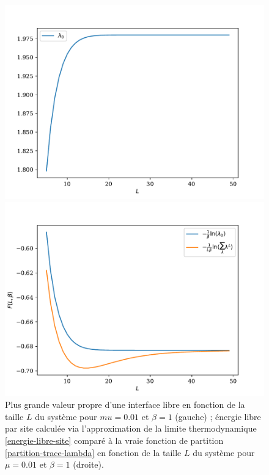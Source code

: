 \begin{figure}
	\begin{minipage}[t]{0.5\linewidth}
		\includegraphics[width=\linewidth]{chap4/freeene-lambda0-mu.pdf}
	\end{minipage}%
	\begin{minipage}[t]{0.5\linewidth}
		\includegraphics[width=\linewidth]{chap4/freeene-thermo-mu.pdf}
	\end{minipage}
	\caption{Plus grande valeur propre d'une interface libre en fonction de la taille $L$ du système pour $mu = 0.01$ et $\beta = 1$ (gauche)  ; énergie libre par site calculée via l'approximation de la limite thermodynamique \ref{energie-libre-site} comparé à la vraie fonction de partition \ref{partition-trace-lambda} en fonction de la taille $L$ du système pour $\mu=0.01$ et $\beta = 1$ (droite).}
	\vspace{-0.5cm}
\end{figure}  
	

